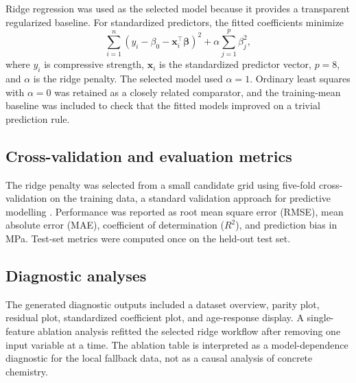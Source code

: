Ridge regression was used as the selected model because it provides a transparent regularized baseline. For standardized predictors, the fitted coefficients minimize
\begin{equation}
  \sum_{i=1}^{n}\left(y_i - \beta_0 - \mathbf{x}_i^\top\boldsymbol{\beta}\right)^2 + \alpha \sum_{j=1}^{p}\beta_j^2,
\end{equation}
where \(y_i\) is compressive strength, \(\mathbf{x}_i\) is the standardized predictor vector, \(p=8\), and \(\alpha\) is the ridge penalty. The selected model used \(\alpha = 1\). Ordinary least squares with \(\alpha=0\) was retained as a closely related comparator, and the training-mean baseline was included to check that the fitted models improved on a trivial prediction rule.

\subsection{Cross-validation and evaluation metrics}
\label{sec:evaluation}

The ridge penalty was selected from a small candidate grid using five-fold cross-validation on the training data, a standard validation approach for predictive modelling \citep{Stone1974_CrossValidation}. Performance was reported as root mean square error (RMSE), mean absolute error (MAE), coefficient of determination (\(R^2\)), and prediction bias in MPa. Test-set metrics were computed once on the held-out test set.

\subsection{Diagnostic analyses}
\label{sec:diagnostics}

The generated diagnostic outputs included a dataset overview, parity plot, residual plot, standardized coefficient plot, and age-response display. A single-feature ablation analysis refitted the selected ridge workflow after removing one input variable at a time. The ablation table is interpreted as a model-dependence diagnostic for the local fallback data, not as a causal analysis of concrete chemistry.
